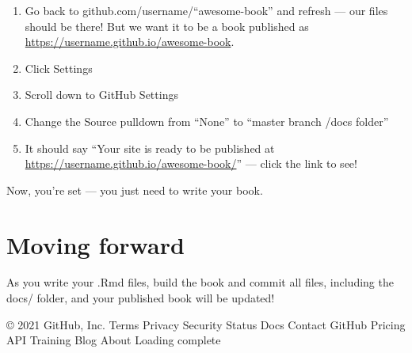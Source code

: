 \documentclass[
]{book}
\providecommand{\tightlist}{%
  \setlength{\itemsep}{0pt}\setlength{\parskip}{0pt}}
\begin{document}
\begin{enumerate}
\def\labelenumi{\arabic{enumi}.}
\tightlist
\item
  Go back to github.com/username/``awesome-book'' and refresh --- our files should be there! But we want it to be a book published as \url{https://username.github.io/awesome-book}.
\item
  Click Settings
\item
  Scroll down to GitHub Settings
\item
  Change the Source pulldown from ``None'' to ``master branch /docs folder''
\item
  It should say ``Your site is ready to be published at \url{https://username.github.io/awesome-book/}'' --- click the link to see!
\end{enumerate}

Now, you're set --- you just need to write your book.

\hypertarget{moving-forward}{%
\section{Moving forward}\label{moving-forward}}

As you write your .Rmd files, build the book and commit all files, including the docs/ folder, and your published book will be updated!

© 2021 GitHub, Inc.
Terms
Privacy
Security
Status
Docs
Contact GitHub
Pricing
API
Training
Blog
About
Loading complete

  
\end{document}
